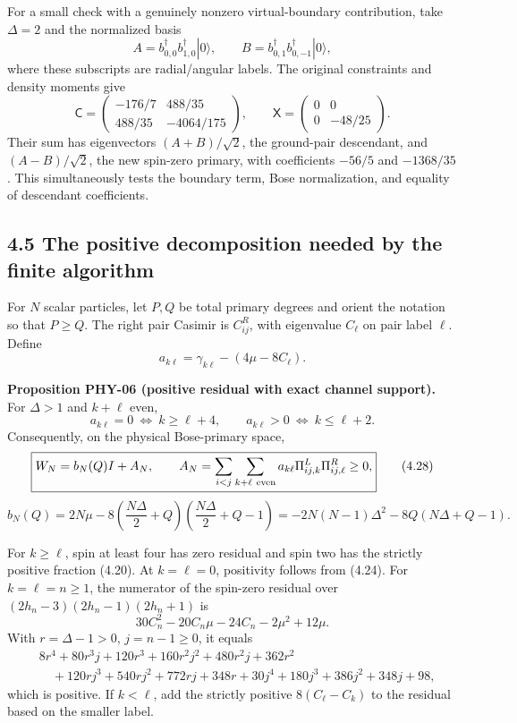 \documentclass[a4paper,11pt]{article}
\numberwithin{equation}{section}
\begin{document}
For a small check with a genuinely nonzero virtual-boundary contribution, take \(\Delta=2\) and the normalized basis \[
A=b^\dagger_{0,0}b^\dagger_{1,0}|0\rangle,\qquad
B=b^\dagger_{0,1}b^\dagger_{0,-1}|0\rangle ,
\] where these subscripts are radial/angular labels. The original constraints and density moments give \[
\mathsf C=
\begin{pmatrix}-176/7&488/35\\488/35&-4064/175\end{pmatrix},
\qquad
\mathsf X=
\begin{pmatrix}0&0\\0&-48/25\end{pmatrix}.
\tag{4.25}
\] Their sum has eigenvectors \((A+B)/\sqrt2\), the ground-pair descendant, and \((A-B)/\sqrt2\), the new spin-zero primary, with coefficients \(-56/5\) and \(-1368/35\). This simultaneously tests the boundary term, Bose normalization, and equality of descendant coefficients.

\hypertarget{the-positive-decomposition-needed-by-the-finite-algorithm}{%
\subsection{4.5 The positive decomposition needed by the finite algorithm}\label{the-positive-decomposition-needed-by-the-finite-algorithm}}

For \(N\) scalar particles, let \(P,Q\) be total primary degrees and orient the notation so that \(P\ge Q\). The right pair Casimir is \(C_{ij}^R\), with eigenvalue \(C_\ell\) on pair label \(\ell\). Define \[
a_{k\ell}=\gamma_{k\ell}-(4\mu-8C_\ell).
\tag{4.26}
\]

\textbf{Proposition PHY-06 (positive residual with exact channel support).} For \(\Delta>1\) and \(k+\ell\) even, \[
a_{k\ell}=0\ \Longleftrightarrow\ k\ge\ell+4,
\qquad
a_{k\ell}>0\ \Longleftrightarrow\ k\le\ell+2.
\tag{4.27}
\] Consequently, on the physical Bose-primary space, \[
\boxed{
W_N=b_N(Q)I+A_N,\qquad
A_N=\sum_{i<j}\sum_{k+\ell\ {\rm even}}
a_{k\ell}\Pi^L_{ij,k}\Pi^R_{ij,\ell}\ge0 ,
}
\tag{4.28}
\] \[
\boxed{
b_N(Q)=2N\mu-
8\left(\frac{N\Delta}{2}+Q\right)
\left(\frac{N\Delta}{2}+Q-1\right)
=-2N(N-1)\Delta^2-8Q(N\Delta+Q-1).
}
\tag{4.29}
\]

For \(k\ge\ell\), spin at least four has zero residual and spin two has the strictly positive fraction (4.20). At \(k=\ell=0\), positivity follows from (4.24). For \(k=\ell=n\ge1\), the numerator of the spin-zero residual over \((2h_n-3)(2h_n-1)(2h_n+1)\) is \[
30C_n^2-20C_n\mu-24C_n-2\mu^2+12\mu .
\] With \(r=\Delta-1>0\), \(j=n-1\ge0\), it equals \[
\begin{aligned}
&8r^4+80r^3j+120r^3+160r^2j^2+480r^2j+362r^2\\
&\quad+120rj^3+540rj^2+772rj+348r
+30j^4+180j^3+386j^2+348j+98,
\end{aligned}
\tag{4.30}
\] which is positive. If \(k<\ell\), add the strictly positive \(8(C_\ell-C_k)\) to the residual based on the smaller label.
\end{document}
